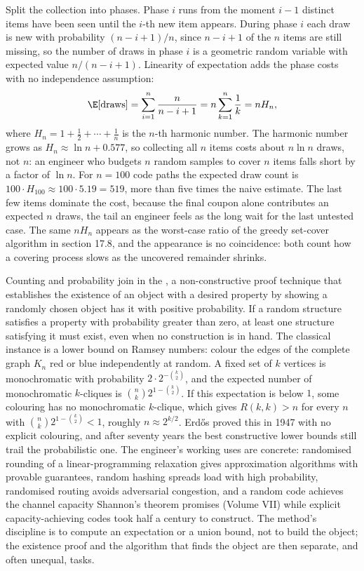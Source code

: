 Split the collection into phases. Phase $i$ runs from the moment $i - 1$
distinct items have been seen until the $i$-th new item appears. During
phase $i$ each draw is new with probability $(n - i + 1)/n$, since $n -
i + 1$ of the $n$ items are still missing, so the number of draws in
phase $i$ is a geometric random variable with expected value $n / (n -
i + 1)$. Linearity of expectation adds the phase costs with no
independence assumption:
\[
\E[\text{draws}] = \sum_{i=1}^{n} \frac{n}{n - i + 1}
= n \sum_{k=1}^{n} \frac{1}{k} = n H_{n},
\]
where $H_{n} = 1 + \tfrac12 + \cdots + \tfrac1n$ is the $n$-th harmonic
number. The harmonic number grows as $H_{n} \approx \ln n + 0.577$, so
collecting all $n$ items costs about $n \ln n$ draws, not $n$: an
engineer who budgets $n$ random samples to cover $n$ items falls short
by a factor of $\ln n$. For $n = 100$ code paths the expected draw
count is $100 \cdot H_{100} \approx 100 \cdot 5.19 = 519$, more than
five times the naive estimate. The last few items dominate the cost,
because the final coupon alone contributes an expected $n$ draws, the
tail an engineer feels as the long wait for the last untested case. The
same $n H_{n}$ appears as the worst-case ratio of the greedy set-cover
algorithm in section 17.8, and the appearance is no coincidence: both
count how a covering process slows as the uncovered remainder shrinks.

\begin{mastery}
Counting and probability join in the ,
a non-constructive proof technique that establishes the existence of
an object with a desired property by showing a randomly chosen object
has it with positive probability. If a random structure satisfies a
property with probability greater than zero, at least one structure
satisfying it must exist, even when no construction is in hand. The
classical instance is a lower bound on Ramsey numbers: colour the
edges of the complete graph $K_{n}$ red or blue independently at
random. A fixed set of $k$ vertices is monochromatic with
probability $2 \cdot 2^{-\binom{k}{2}}$, and the expected number of
monochromatic $k$-cliques is $\binom{n}{k} 2^{1 - \binom{k}{2}}$. If
this expectation is below $1$, some colouring has no monochromatic
$k$-clique, which gives $R(k, k) > n$ for every $n$ with $\binom{n}{k}
2^{1 - \binom{k}{2}} < 1$, roughly $n \approx 2^{k/2}$. Erd\H{o}s
proved this in 1947 with no explicit colouring, and after seventy
years the best constructive lower bounds still trail the
probabilistic one. The engineer's working uses are concrete:
randomised rounding of a linear-programming relaxation gives
approximation algorithms with provable guarantees, random hashing
spreads load with high probability, randomised routing avoids
adversarial congestion, and a random code achieves the channel
capacity Shannon's theorem promises (Volume VII) while explicit
capacity-achieving codes took half a century to construct. The
method's discipline is to compute an expectation or a union bound,
not to build the object; the existence proof and the algorithm that
finds the object are then separate, and often unequal, tasks.
\end{mastery}

